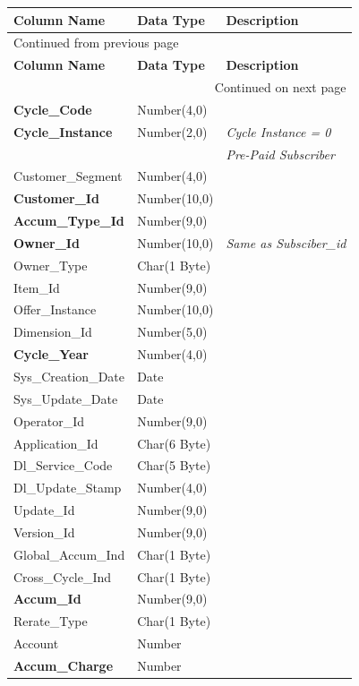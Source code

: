 \documentclass[12pt,twoside]{article}
\begin{document}
\begin{longtable}{l|l|l}
\hline
\textbf{Column Name} & \textbf{Data Type} & \textbf{Description}\\
\hline
\endfirsthead
\multicolumn{3}{l}{Continued from previous page} \\
\hline

\textbf{Column Name} & \textbf{Data Type} & \textbf{Description} \\

\hline
\endhead
\hline\multicolumn{3}{r}{Continued on next page} \\
\endfoot
\endlastfoot
\hline
\textbf{Cycle\_Code} & Number(4,0) & \\
\textbf{Cycle\_Instance} & Number(2,0) & \emph{Cycle Instance = 0}\\
 &  & \emph{Pre-Paid Subscriber}\\
Customer\_Segment & Number(4,0) & \\
\textbf{Customer\_Id} & Number(10,0) & \\
\textbf{Accum\_Type\_Id} & Number(9,0) & \\
\textbf{Owner\_Id} & Number(10,0) & \emph{Same as Subsciber\_id}\\
Owner\_Type & Char(1 Byte) & \\
Item\_Id & Number(9,0) & \\
Offer\_Instance & Number(10,0) & \\
Dimension\_Id & Number(5,0) & \\
\textbf{Cycle\_Year} & Number(4,0) & \\
Sys\_Creation\_Date & Date & \\
Sys\_Update\_Date & Date & \\
Operator\_Id & Number(9,0) & \\
Application\_Id & Char(6 Byte) & \\
Dl\_Service\_Code & Char(5 Byte) & \\
Dl\_Update\_Stamp & Number(4,0) & \\
Update\_Id & Number(9,0) & \\
Version\_Id & Number(9,0) & \\
Global\_Accum\_Ind & Char(1 Byte) & \\
Cross\_Cycle\_Ind & Char(1 Byte) & \\
\textbf{Accum\_Id} & Number(9,0) & \\
Rerate\_Type & Char(1 Byte) & \\
Account & Number & \\
\textbf{Accum\_Charge} & Number & \\

\end{longtable}
\end{document}
